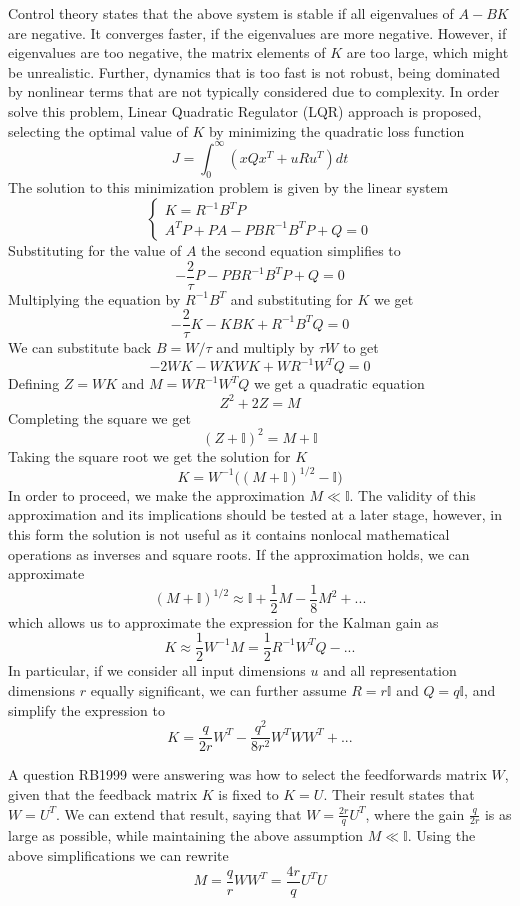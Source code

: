 \documentclass[11pt,a4paper]{article}
\begin{document}
Control theory states that the above system is stable if all eigenvalues of $A-BK$ are negative. It converges faster, if the eigenvalues are more negative. However, if eigenvalues are too negative, the matrix elements of $K$ are too large, which might be unrealistic. Further, dynamics that is too fast is not robust, being dominated by nonlinear terms that are not typically considered due to complexity. In order solve this problem, Linear Quadratic Regulator (LQR) approach is proposed, selecting the optimal value of $K$ by minimizing the quadratic loss function
$$J = \int_0^{\infty} (xQx^T +uRu^T)dt$$
The solution to this minimization problem is given by the linear system
$$
\begin{cases}
K = R^{-1}B^T P\\
A^TP + PA - PBR^{-1}B^TP + Q = 0
\end{cases}
$$
Substituting for the value of $A$ the second equation simplifies to
$$-\frac{2}{\tau} P - PBR^{-1}B^TP + Q = 0$$
Multiplying the equation by $R^{-1}B^T$ and substituting for $K$ we get
$$-\frac{2}{\tau} K - KBK + R^{-1}B^TQ = 0$$
We can substitute back $B = W / \tau$ and multiply by $\tau W$ to get
$$-2 WK - WKWK + WR^{-1}W^TQ = 0$$
Defining $Z = WK$ and $M = WR^{-1}W^TQ$ we get a quadratic equation
$$Z^2 + 2 Z = M$$
Completing the square we get
$$(Z + \mathbb{I})^2 = M + \mathbb{I}$$
Taking the square root we get the solution for $K$
$$K = W^{-1}\biggl((M + \mathbb{I})^{1/2} - \mathbb{I} \biggr)$$
In order to proceed, we make the approximation $M \ll \mathbb{I}$. The validity of this approximation and its implications should be tested at a later stage, however, in this form the solution is not useful as it contains nonlocal mathematical operations as inverses and square roots. If the approximation holds, we can approximate
$$(M + \mathbb{I})^{1/2} \approx \mathbb{I} + \frac{1}{2}M - \frac{1}{8}M^2 + ...$$
which allows us to approximate the expression for the Kalman gain as
$$K \approx \frac{1}{2}W^{-1}M = \frac{1}{2}R^{-1}W^TQ - ...$$
In particular, if we consider all input dimensions $u$ and all representation dimensions $r$ equally significant, we can further assume $R = r\mathbb{I}$ and $Q = q\mathbb{I}$, and simplify the expression to
$$K = \frac{q}{2r}W^T - \frac{q^2}{8r^2}W^TWW^T + ...$$

A question RB1999 were answering was how to select the feedforwards matrix $W$, given that the feedback matrix $K$ is fixed to $K = U$. Their result states that $W = U^T$. We can extend that result, saying that $W = \frac{2r}{q}U^T$, where the gain $\frac{q}{2r}$ is as large as possible, while maintaining the above assumption $M \ll \mathbb{I}$. Using the above simplifications we can rewrite
$$M = \frac{q}{r} W W^T = \frac{4r}{q} U^T U$$
\end{document}

